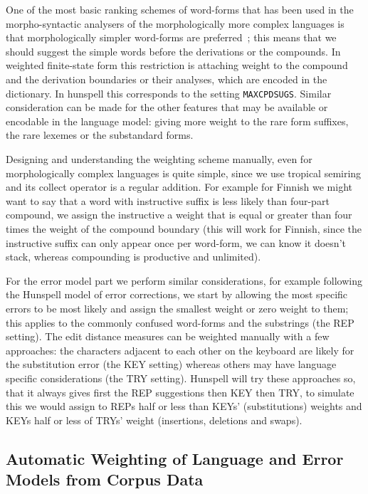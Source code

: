 \documentclass[a4paper,12pt]{article}
\begin{document}
One of the most basic ranking schemes of word-forms that has been used in the
morpho-syntactic analysers of the morphologically more complex languages is
that morphologically simpler word-forms are
preferred~\cite[]{karlsson1992swetwol}; this means that we should suggest the
simple words before the derivations or the compounds.  In weighted finite-state
form this restriction is attaching weight to the compound and the derivation
boundaries or their analyses, which are encoded in the dictionary. In hunspell
this corresponds to the setting \texttt{MAXCPDSUGS}. Similar consideration can
be made for the other features that may be available or encodable in the
language model: giving more weight to the rare form suffixes, the rare lexemes
or the substandard forms.

Designing and understanding the weighting scheme manually, even for
morphologically complex languages is quite simple, since we use tropical
semiring and its collect operator is a regular addition. For example for
Finnish we might want to say that a word with instructive suffix is less likely
than four-part compound, we assign the instructive a weight that is equal or
greater than four times the weight of the compound boundary (this will work for
Finnish, since the instructive suffix can only appear once per word-form, we
can know it doesn't stack, whereas compounding is productive and unlimited).

For the error model part we perform similar considerations, for example
following the Hunspell model of error corrections, we start by allowing the
most specific errors to be most likely and assign the smallest weight or zero
weight to them; this applies to the commonly confused word-forms and the
substrings (the REP setting). The edit distance measures can be weighted
manually with a few approaches: the characters adjacent to each other on the
keyboard are likely for the substitution error (the KEY setting) whereas others
may have language specific considerations (the TRY setting).  Hunspell will try
these approaches so, that it always gives first the REP suggestions then KEY
then TRY, to simulate this we would assign to REPs half or less than KEYs'
(substitutions) weights and KEYs half or less of TRYs' weight (insertions,
deletions and swaps).

\subsection{Automatic Weighting of Language and Error Models from Corpus Data}
\label{subsec:automatic-weighting}
\end{document}
